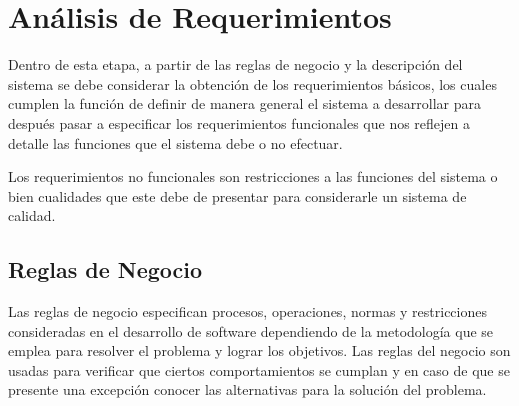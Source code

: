 \section{Análisis de Requerimientos}

Dentro de esta etapa, a partir de las reglas de negocio y la descripción del sistema se debe considerar la obtención de los requerimientos básicos, los cuales cumplen la función de definir de manera general el sistema a desarrollar para después pasar a especificar los requerimientos funcionales que nos reflejen a detalle las funciones que el sistema debe o no efectuar.

Los requerimientos no funcionales son restricciones a las funciones del sistema o bien cualidades que este debe de presentar para considerarle un sistema de calidad.

\subsection{Reglas de Negocio}

Las reglas de negocio especifican procesos, operaciones, normas y restricciones consideradas en el desarrollo de software dependiendo de la metodología que se emplea para resolver el problema y lograr los objetivos. Las reglas del negocio son usadas para verificar que ciertos comportamientos se cumplan y en caso de que se presente una excepción conocer las alternativas para la solución del problema.

